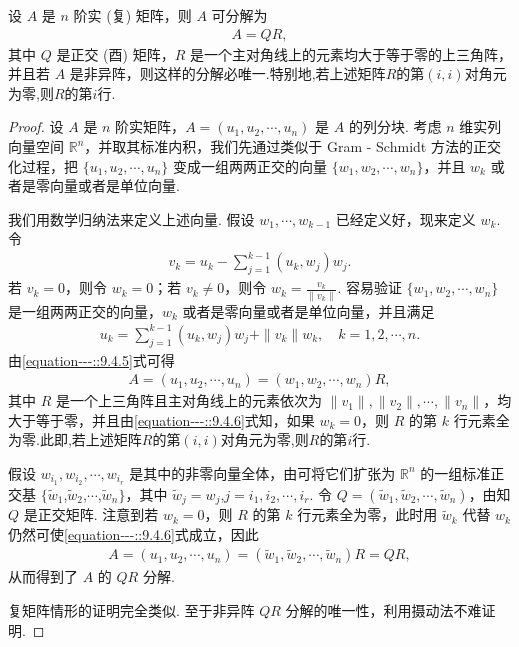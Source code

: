 \documentclass[../../main.tex]{subfiles}
\begin{document}
\begin{theorem}[矩阵的QR分解]\label{theorem:矩阵的QR分解}
设 $A$ 是 $n$ 阶实 (复) 矩阵，则 $A$ 可分解为
\begin{align*}
A = QR,
\end{align*}
其中 $Q$ 是正交 (酉) 矩阵，$R$ 是一个主对角线上的元素均大于等于零的上三角阵，并且若 $A$ 是非异阵，则这样的分解必唯一.特别地,若上述矩阵$R$的第$(i,i)$对角元为零,则$R$的第$i$行.
\end{theorem}
\begin{proof}
设 $A$ 是 $n$ 阶实矩阵，$A = (u_1,u_2,\cdots,u_n)$ 是 $A$ 的列分块. 考虑 $n$ 维实列向量空间 $\mathbb{R}^n$，并取其标准内积，我们先通过类似于 Gram - Schmidt 方法的正交化过程，把 $\{u_1,u_2,\cdots,u_n\}$ 变成一组两两正交的向量 $\{w_1,w_2,\cdots,w_n\}$，并且 $w_k$ 或者是零向量或者是单位向量.

我们用数学归纳法来定义上述向量. 假设 $w_1,\cdots,w_{k - 1}$ 已经定义好，现来定义 $w_k$. 令
\begin{align*}
v_k = u_k - \sum_{j = 1}^{k - 1}(u_k,w_j)w_j.
\end{align*}
若 $v_k = 0$，则令 $w_k = 0$；若 $v_k \neq 0$，则令 $w_k = \frac{v_k}{\|v_k\|}$. 容易验证 $\{w_1,w_2,\cdots,w_n\}$ 是一组两两正交的向量，$w_k$ 或者是零向量或者是单位向量，并且满足
\begin{align}
u_k = \sum_{j = 1}^{k - 1}(u_k,w_j)w_j + \|v_k\|w_k,\quad k = 1,2,\cdots,n.\label{equation---::9.4.5}
\end{align}
由\eqref{equation---::9.4.5}式可得
\begin{align}
A = (u_1,u_2,\cdots,u_n) = (w_1,w_2,\cdots,w_n)R,\label{equation---::9.4.6}
\end{align}
其中 $R$ 是一个上三角阵且主对角线上的元素依次为 $\|v_1\|,\|v_2\|,\cdots,\|v_n\|$，均大于等于零，并且由\eqref{equation---::9.4.6}式知，如果 $w_k = 0$，则 $R$ 的第 $k$ 行元素全为零.此即,若上述矩阵$R$的第$(i,i)$对角元为零,则$R$的第$i$行.

假设 $w_{i_1},w_{i_2},\cdots,w_{i_r}$ 是其中的非零向量全体，由可将它们扩张为 $\mathbb{R}^n$ 的一组标准正交基 $\{\widetilde{w}_1$,$\widetilde{w}_2$,$\cdots$,$\widetilde{w}_n\}$，其中 $\widetilde{w}_j = w_j$,$j = i_1,i_2,\cdots,i_r$. 令 $Q = (\widetilde{w}_1,\widetilde{w}_2,\cdots,\widetilde{w}_n)$，由知 $Q$ 是正交矩阵. 注意到若 $w_k = 0$，则 $R$ 的第 $k$ 行元素全为零，此时用 $\widetilde{w}_k$ 代替 $w_k$ 仍然可使\eqref{equation---::9.4.6}式成立，因此
\begin{align*}
A = (u_1,u_2,\cdots,u_n) = (\widetilde{w}_1,\widetilde{w}_2,\cdots,\widetilde{w}_n)R = QR,
\end{align*}
从而得到了 $A$ 的 $QR$ 分解.

复矩阵情形的证明完全类似.
至于非异阵 $QR$ 分解的唯一性，利用摄动法不难证明.
\end{proof}
\end{document}

